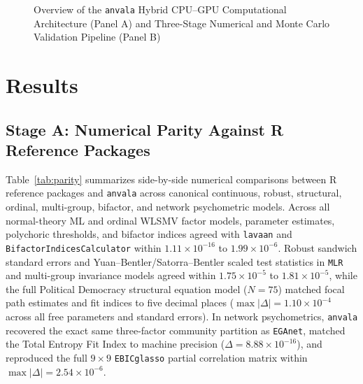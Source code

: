 ﻿\documentclass[12pt,letterpaper]{article}
\begin{document}
\begin{figure}[htbp]
    \caption{Overview of the \texttt{anvala} Hybrid CPU--GPU Computational Architecture (Panel A) and Three-Stage Numerical and Monte Carlo Validation Pipeline (Panel B)}
    \label{fig:workflow}
\end{figure}

\section{Results}

\subsection{Stage A: Numerical Parity Against R Reference Packages}

Table~\ref{tab:parity} summarizes side-by-side numerical comparisons between R reference packages and \texttt{anvala} across canonical continuous, robust, structural, ordinal, multi-group, bifactor, and network psychometric models. Across all normal-theory ML and ordinal WLSMV factor models, parameter estimates, polychoric thresholds, and bifactor indices agreed with \texttt{lavaan} and \texttt{BifactorIndicesCalculator} within $1.11 \times 10^{-16}$ to $1.99 \times 10^{-6}$. Robust sandwich standard errors and Yuan--Bentler/Satorra--Bentler scaled test statistics in \texttt{MLR} and multi-group invariance models agreed within $1.75 \times 10^{-5}$ to $1.81 \times 10^{-5}$, while the full Political Democracy structural equation model ($N = 75$) matched focal path estimates and fit indices to five decimal places ($\max|\Delta| = 1.10 \times 10^{-4}$ across all free parameters and standard errors). In network psychometrics, \texttt{anvala} recovered the exact same three-factor community partition as \texttt{EGAnet}, matched the Total Entropy Fit Index to machine precision ($\Delta = 8.88 \times 10^{-16}$), and reproduced the full $9 \times 9$ \texttt{EBICglasso} partial correlation matrix within $\max|\Delta| = 2.54 \times 10^{-6}$.
\end{document}
